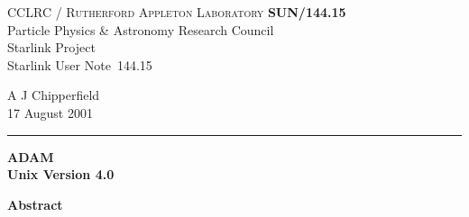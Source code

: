 \documentclass[twoside,11pt]{article}
\newcommand{\stardoccategory}  {Starlink User Note}
\newcommand{\stardocinitials}  {SUN}
\newcommand{\stardocnumber}    {144.15}
\newcommand{\stardocauthors}   {A J Chipperfield}
\newcommand{\stardocdate}      {17 August 2001}
\newcommand{\stardoctitle}     {ADAM}
\newcommand{\stardocversion}   {Unix Version 4.0}
\newcommand{\stardocmanual}    {}
\newcommand{\stardocname}{\stardocinitials /\stardocnumber}
\newenvironment{latexonly}{}{}
\renewcommand{\_}{\texttt{\symbol{95}}}
\begin{document}
\thispagestyle{empty}

\begin{latexonly}
   CCLRC / \textsc{Rutherford Appleton Laboratory} \hfill \textbf{\stardocname}\\
   {\large Particle Physics \& Astronomy Research Council}\\
   {\large Starlink Project\\}
   {\large \stardoccategory\ \stardocnumber}
   \begin{flushright}
   \stardocauthors\\
   \stardocdate
   \end{flushright}
   \vspace{-4mm}
   \rule{\textwidth}{0.5mm}
   \vspace{5mm}
   \begin{center}
   {\Huge\textbf{\stardoctitle \\ [2.5ex]}}
   {\LARGE\textbf{\stardocversion \\ [4ex]}}
   {\Huge\textbf{\stardocmanual}}
   \end{center}
   \vspace{5mm}


   \vspace{10mm}
   \begin{center}
      {\Large\textbf{Abstract}}
   \end{center}
\end{latexonly}
\end{document}
